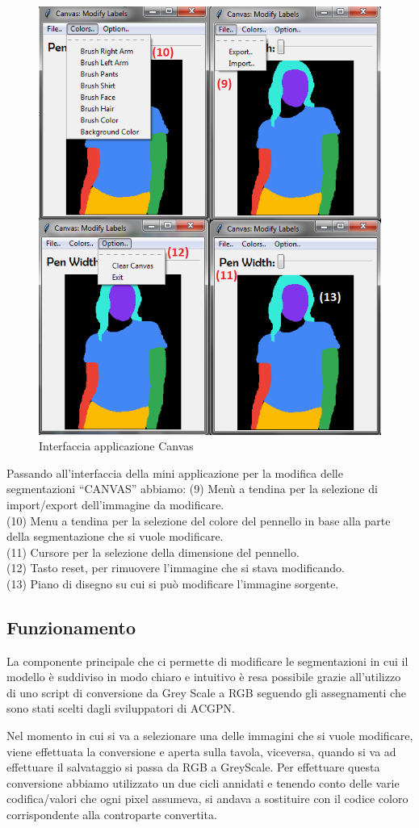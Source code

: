 \documentclass[final, 11pt]{article}
\begin{document}
	\begin{figure}[!htb]
		\centering
		\includegraphics[width=0.5\linewidth]{PyTryOn_numerata_2.png}
		\caption{Interfaccia applicazione Canvas}
	\end{figure} 
	Passando all’interfaccia della mini applicazione per la modifica delle segmentazioni “CANVAS” abbiamo:
\newline
	(9) Menù a tendina per la selezione di import/export dell’immagine da modificare. \\
	(10) Menu a tendina per la selezione del colore del pennello in base alla parte della segmentazione che si vuole modificare. 
\\
	(11) Cursore per la selezione della dimensione del pennello. 
\\
	(12) Tasto reset, per rimuovere l’immagine che si stava modificando. \\
	(13) Piano di disegno su cui si può modificare l’immagine sorgente.
\\
	
	\subsection{Funzionamento}
	La componente principale che ci permette di modificare le segmentazioni in cui il modello è suddiviso in modo chiaro e intuitivo è resa possibile grazie all’utilizzo di uno script di conversione da Grey Scale a RGB seguendo gli assegnamenti che sono stati scelti dagli sviluppatori di ACGPN. 
	
	Nel momento in cui si va a selezionare una delle immagini che si vuole modificare, viene effettuata la conversione e aperta sulla tavola, viceversa, quando si va ad effettuare il salvataggio si passa da RGB a GreyScale. Per effettuare questa conversione abbiamo utilizzato un due cicli annidati e tenendo conto delle varie codifica/valori che ogni pixel assumeva, si andava a sostituire con il codice coloro corrispondente alla controparte convertita.
	
\end{document}
